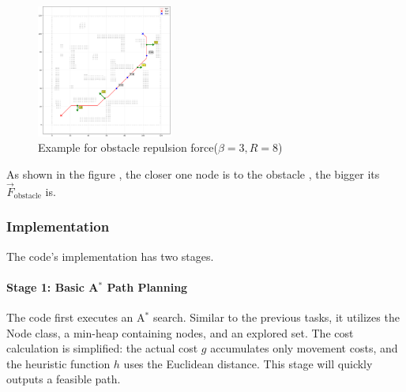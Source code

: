 \documentclass[aps,letterpaper,10pt]{revtex4}
\begin{document}
\begin{enumerate}
	\begin{figure}[h!]
		\centering %
		\includegraphics[width=0.4\textwidth]{obstacle_force.png} %
		\caption{Example for obstacle repulsion force($\beta = 3 ,R =8$)} %
		\label{fig:logo} %
	\end{figure}
	As shown in the figure , the closer one node is to the obstacle , the bigger its $\vec{F}_{\text{obstacle}}$ is.
\end{enumerate}

\subsubsection{Implementation}
The code's implementation has two stages.

\paragraph{Stage 1: Basic A$^*$ Path Planning}
The code first executes an A$^*$ search. Similar to the previous tasks, it utilizes the Node class, a  min-heap containing nodes, and an explored set. The cost calculation is simplified: the actual cost $g$ accumulates only movement costs, and the heuristic function $h$ uses the Euclidean distance. This stage will quickly outputs a feasible path.
\end{document}
